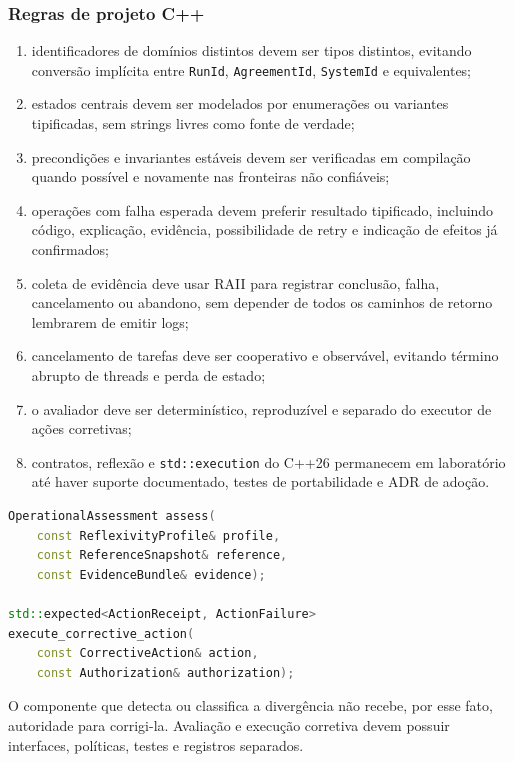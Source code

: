 \documentclass[11pt,a4paper,oneside]{article}
\begin{document}
\subsubsection{Regras de projeto C++}
\begin{enumerate}
  \item identificadores de domínios distintos devem ser tipos distintos, evitando conversão implícita entre \texttt{RunId}, \texttt{AgreementId}, \texttt{SystemId} e equivalentes;
  \item estados centrais devem ser modelados por enumerações ou variantes tipificadas, sem strings livres como fonte de verdade;
  \item precondições e invariantes estáveis devem ser verificadas em compilação quando possível e novamente nas fronteiras não confiáveis;
  \item operações com falha esperada devem preferir resultado tipificado, incluindo código, explicação, evidência, possibilidade de retry e indicação de efeitos já confirmados;
  \item coleta de evidência deve usar RAII para registrar conclusão, falha, cancelamento ou abandono, sem depender de todos os caminhos de retorno lembrarem de emitir logs;
  \item cancelamento de tarefas deve ser cooperativo e observável, evitando término abrupto de threads e perda de estado;
  \item o avaliador deve ser determinístico, reproduzível e separado do executor de ações corretivas;
  \item contratos, reflexão e \texttt{std::execution} do C++26 permanecem em laboratório até haver suporte documentado, testes de portabilidade e ADR de adoção.
\end{enumerate}

\begin{lstlisting}[language=C++]
OperationalAssessment assess(
    const ReflexivityProfile& profile,
    const ReferenceSnapshot& reference,
    const EvidenceBundle& evidence);

std::expected<ActionReceipt, ActionFailure>
execute_corrective_action(
    const CorrectiveAction& action,
    const Authorization& authorization);
\end{lstlisting}

\begin{decisao}
O componente que detecta ou classifica a divergência não recebe, por esse fato, autoridade para corrigi-la. Avaliação e execução corretiva devem possuir interfaces, políticas, testes e registros separados.
\end{decisao}
\end{document}
